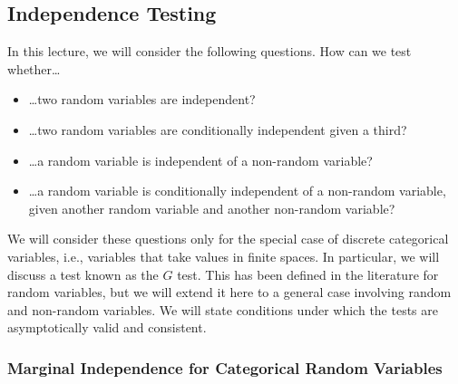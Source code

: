 \subsection{Independence Testing}

In this lecture, we will consider the following questions. How can we test whether\dots
\begin{itemize}
  \item \dots two random variables are independent?
  \item \dots two random variables are conditionally independent given a third?
  \item \dots a random variable is independent of a non-random variable?
  \item \dots a random variable is conditionally independent of a non-random variable, given another random variable and another non-random variable?
\end{itemize}
We will consider these questions only for the special case of discrete categorical variables, i.e., 
variables that take values in finite spaces.  In particular, we will discuss a test known as the $G$ test.
This has been defined in the literature for random variables, but we will extend it here to a general case
involving random and non-random variables.
We will state conditions under which the tests are asymptotically valid and consistent.

\subsubsection{Marginal Independence for Categorical Random Variables}

